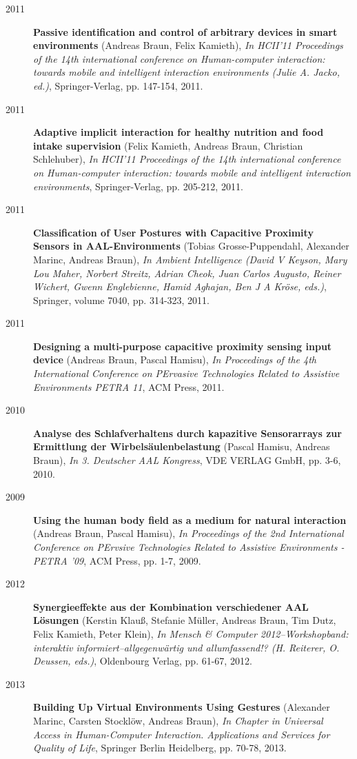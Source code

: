 \begin{appendix}
\begin{description}
\item[2011] {\bf Passive identification and control of arbitrary devices in smart environments} (Andreas Braun, Felix Kamieth), {\em In HCII'11 Proceedings of the 14th international conference on Human-computer interaction: towards mobile and intelligent interaction environments (Julie A. Jacko, ed.)}, Springer-Verlag, pp. 147-154, 2011.
\item[2011] {\bf Adaptive implicit interaction for healthy nutrition and food intake supervision} (Felix Kamieth, Andreas Braun, Christian Schlehuber), {\em In HCII'11 Proceedings of the 14th international conference on Human-computer interaction: towards mobile and intelligent interaction environments}, Springer-Verlag, pp. 205-212, 2011.
\item[2011]{\bf Classification of User Postures with Capacitive Proximity Sensors in AAL-Environments} (Tobias Grosse-Puppendahl, Alexander Marinc, Andreas Braun), {\em In Ambient Intelligence (David V Keyson, Mary Lou Maher, Norbert Streitz, Adrian Cheok, Juan Carlos Augusto, Reiner Wichert, Gwenn Englebienne, Hamid Aghajan, Ben J A Kröse, eds.)}, Springer, volume 7040, pp. 314-323, 2011.
\item[2011] {\bf Designing a multi-purpose capacitive proximity sensing input device} (Andreas Braun, Pascal Hamisu), {\em In Proceedings of the 4th International Conference on PErvasive Technologies Related to Assistive Environments PETRA 11}, ACM Press, 2011.
\item[2010]{\bf Analyse des Schlafverhaltens durch kapazitive Sensorarrays zur Ermittlung der Wirbelsäulenbelastung} (Pascal Hamisu, Andreas Braun), {\em In 3. Deutscher AAL Kongress}, VDE VERLAG GmbH, pp. 3-6, 2010.
\item[2009] {\bf Using the human body field as a medium for natural interaction} (Andreas Braun, Pascal Hamisu), {\em In Proceedings of the 2nd International Conference on PErvsive Technologies Related to Assistive Environments - PETRA '09}, ACM Press, pp. 1-7, 2009.
\item[2012] {\bf Synergieeffekte aus der Kombination verschiedener AAL Lösungen} (Kerstin Klauß, Stefanie Müller, Andreas Braun, Tim Dutz, Felix Kamieth, Peter Klein), {\em In Mensch \& Computer 2012--Workshopband: interaktiv informiert--allgegenwärtig und allumfassend!? (H. Reiterer, O. Deussen, eds.)}, Oldenbourg Verlag, pp. 61-67, 2012.
\item[2013]{\bf Building Up Virtual Environments Using Gestures} (Alexander Marinc, Carsten Stocklöw, Andreas Braun), {\em In Chapter in Universal Access in Human-Computer Interaction. Applications and Services for Quality of Life}, Springer Berlin Heidelberg, pp. 70-78, 2013.

\end{description}
\end{appendix}

